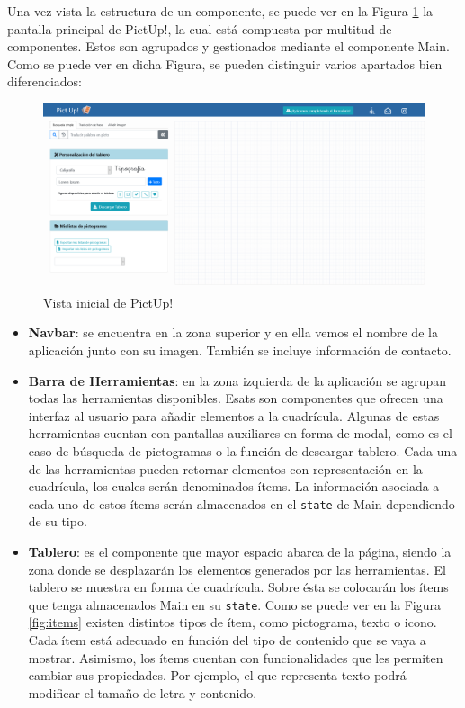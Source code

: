 Una vez vista la estructura de un componente, se puede ver en la Figura \ref{fig:pantallaprincipal} la pantalla principal de PictUp!, la cual está compuesta por multitud de componentes. Estos son agrupados y gestionados mediante el componente Main. Como se puede ver en dicha Figura, se pueden distinguir varios apartados bien diferenciados: 

\begin{figure}[h!]
	\centering
	\includegraphics[width=\linewidth]{Imagenes/Bitmap/pantallaprincipal}
	\caption{Vista inicial de PictUp!
	}
	\label{fig:pantallaprincipal}
\end{figure}

\begin{itemize}
	\item \textbf{Navbar}: se encuentra en la zona superior y en ella vemos el nombre de la aplicación junto con su imagen. También se incluye información de contacto.
	
	
	\item \textbf{Barra de Herramientas}: en la zona izquierda de la aplicación se agrupan todas las herramientas disponibles. 
	Esats son componentes que ofrecen una interfaz al usuario para añadir elementos a la cuadrícula. Algunas de estas herramientas cuentan con pantallas auxiliares en forma de modal, como es el caso de búsqueda de pictogramas o la función de descargar tablero. Cada una de las herramientas pueden retornar elementos con representación en la cuadrícula, los cuales serán denominados ítems. La información asociada a cada uno de estos ítems serán almacenados en el \texttt{state} de Main dependiendo de su tipo.
	
	\item \textbf{Tablero}: es el componente que mayor espacio abarca de la página, siendo la zona donde se desplazarán los elementos generados por las herramientas. El tablero se muestra en forma de cuadrícula. Sobre ésta se colocarán los ítems que tenga almacenados Main en su \texttt{state}.  Como se puede ver en la Figura \ref{fig:items} existen distintos tipos de ítem, como pictograma, texto o icono. Cada ítem está adecuado en función del tipo de contenido que se vaya a mostrar. Asimismo, los ítems cuentan con funcionalidades que les permiten cambiar sus propiedades. Por ejemplo, el que representa texto podrá modificar el tamaño de letra y contenido.  
	
\end{itemize}


